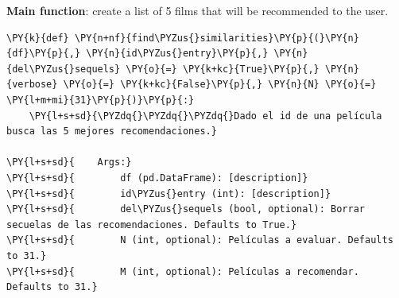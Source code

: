     \textbf{Main function}: create a list of 5 films that will be
recommended to the user.

    \begin{tcolorbox}[breakable, size=fbox, boxrule=1pt, pad at break*=1mm,colback=cellbackground, colframe=cellborder]
\begin{Verbatim}[commandchars=\\\{\}]
\PY{k}{def} \PY{n+nf}{find\PYZus{}similarities}\PY{p}{(}\PY{n}{df}\PY{p}{,} \PY{n}{id\PYZus{}entry}\PY{p}{,} \PY{n}{del\PYZus{}sequels} \PY{o}{=} \PY{k+kc}{True}\PY{p}{,} \PY{n}{verbose} \PY{o}{=} \PY{k+kc}{False}\PY{p}{,} \PY{n}{N} \PY{o}{=} \PY{l+m+mi}{31}\PY{p}{)}\PY{p}{:}
    \PY{l+s+sd}{\PYZdq{}\PYZdq{}\PYZdq{}Dado el id de una película busca las 5 mejores recomendaciones.}

\PY{l+s+sd}{    Args:}
\PY{l+s+sd}{        df (pd.DataFrame): [description]}
\PY{l+s+sd}{        id\PYZus{}entry (int): [description]}
\PY{l+s+sd}{        del\PYZus{}sequels (bool, optional): Borrar secuelas de las recomendaciones. Defaults to True.}
\PY{l+s+sd}{        N (int, optional): Películas a evaluar. Defaults to 31.}
\PY{l+s+sd}{        M (int, optional): Películas a recomendar. Defaults to 31.}


\end{Verbatim}
\end{tcolorbox}
